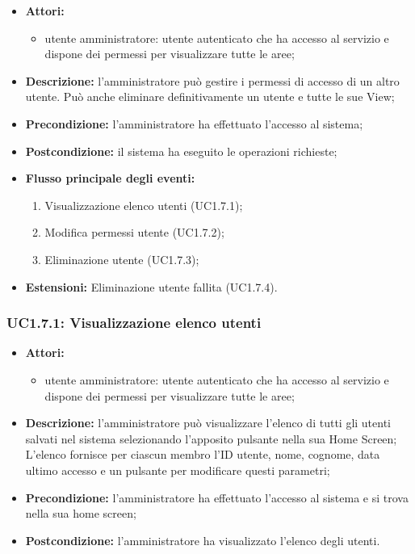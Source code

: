 \begin{itemize}
	\item \textbf{Attori:}
	\begin{itemize}
		\item utente amministratore: utente autenticato che ha accesso al servizio e dispone dei permessi per visualizzare tutte le aree;
	\end{itemize}
	\item \textbf{Descrizione:} l'amministratore può gestire i permessi di accesso di un altro utente. Può anche eliminare definitivamente un utente e tutte le sue View;
	\item \textbf{Precondizione:} l'amministratore ha effettuato l'accesso al sistema;
	\item \textbf{Postcondizione:} il sistema ha eseguito le operazioni richieste;
	\item \textbf{Flusso principale degli eventi:}
	\begin{enumerate}
		\item Visualizzazione elenco utenti (UC1.7.1);
		\item Modifica permessi utente (UC1.7.2);
		\item Eliminazione utente (UC1.7.3);
	\end{enumerate}
	\item \textbf{Estensioni:} Eliminazione utente fallita (UC1.7.4).
\end{itemize}

\subsubsection{UC1.7.1: Visualizzazione elenco utenti}

\begin{itemize}
	\item \textbf{Attori:}
	\begin{itemize}
		\item utente amministratore: utente autenticato che ha accesso al servizio e dispone dei permessi per visualizzare tutte le aree;
	\end{itemize}
	\item \textbf{Descrizione:} l'amministratore può visualizzare l'elenco di tutti gli utenti salvati nel sistema selezionando l'apposito pulsante nella sua Home Screen; L'elenco fornisce per ciascun membro l'ID utente, nome, cognome, data ultimo accesso e un pulsante per modificare questi parametri;
	\item \textbf{Precondizione:} l'amministratore ha effettuato l'accesso al sistema e si trova nella sua home screen;
	\item \textbf{Postcondizione:} l'amministratore ha visualizzato l'elenco degli utenti.
\end{itemize}

